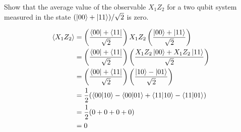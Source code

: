 \begin{example}
    Show that the average value of the observable $X_1Z_2$ for a two qubit system measured in the state $(\ket{00}+\ket{11})/\sqrt{2}$ is zero.

    \begin{align*}
        \braket{X_1Z_2}&=\left(\frac{\bra{00}+\bra{11}}{\sqrt{2}}\right)X_1Z_2\left(\frac{\ket{00}+\ket{11}}{\sqrt{2}}\right)\\
        &=\left(\frac{\bra{00}+\bra{11}}{\sqrt{2}}\right)\left(\frac{X_1Z_2\ket{00}+X_1Z_2\ket{11}}{\sqrt{2}}\right)\\
        &=\left(\frac{\bra{00}+\bra{11}}{\sqrt{2}}\right)\left(\frac{\ket{10}-\ket{01}}{\sqrt{2}}\right)\\
        &=\frac{1}{2}(\braket{00|10}-\braket{00|01}+\braket{11|10}-\braket{11|01})\\
        &=\frac{1}{2}(0+0+0+0)\\
        &=0
    \end{align*}
\end{example}
